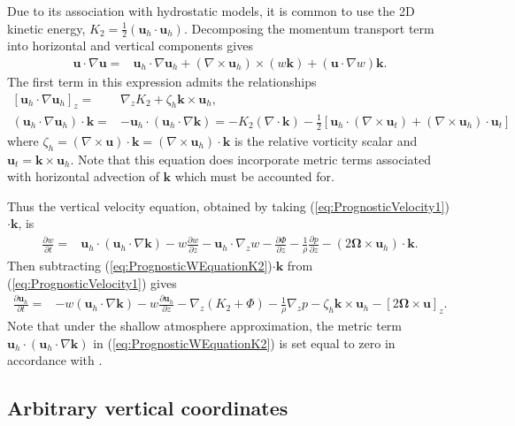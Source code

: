 \documentclass[gmd, manuscript]{copernicus}
\newcommand{\vb}{\mathbf}
\newcommand{\vg}{\boldsymbol}
\newcommand{\pdiff}[2]{\frac{\partial #1}{\partial #2}}
\begin{document}
Due to its association with hydrostatic models, it is common to use the 2D kinetic energy, $K_2 = \frac{1}{2} (\vb{u}_h \cdot \vb{u}_h)$.  Decomposing the momentum transport term into horizontal and vertical components gives
\begin{align}
\vb{u} \cdot \nabla \vb{u} =& \vb{u}_h \cdot \nabla \vb{u}_h + (\nabla \times \vb{u}_h) \times (w \vb{k}) + (\vb{u} \cdot \nabla w) \vb{k}.
\end{align}  The first term in this expression admits the relationships
\begin{align}
\left[ \vb{u}_h \cdot \nabla \vb{u}_h \right]_z =& \nabla_z K_2 + \zeta_h \vb{k} \times \vb{u}_h, \label{eq:UhDotNablaUhRelationship1} \\
(\vb{u}_h \cdot \nabla \vb{u}_h) \cdot \vb{k} =& - \vb{u}_h \cdot (\vb{u}_h \cdot \nabla \vb{k}) = - K_2 (\nabla \cdot \vb{k}) - \tfrac{1}{2} \left[ \vb{u}_h \cdot (\nabla \times \vb{u}_t)  + (\nabla \times \vb{u}_h) \cdot \vb{u}_t \right] \label{eq:UhDotNablaUhRelationship2}
\end{align} where $\zeta_h = (\nabla \times \vb{u}) \cdot \vb{k} = (\nabla \times \vb{u}_h) \cdot \vb{k}$ is the relative vorticity scalar and $\vb{u}_t = \vb{k} \times \vb{u}_h$.  Note that this equation does incorporate metric terms associated with horizontal advection of $\vb{k}$ which must be accounted for.

Thus the vertical velocity equation, obtained by taking (\ref{eq:PrognosticVelocity1})$\cdot \vb{k}$, is
\begin{align} \label{eq:PrognosticWEquationK2}
\pdiff{w}{t} =& \vb{u}_h \cdot (\vb{u}_h \cdot \nabla \vb{k}) - w \pdiff{w}{z} - \vb{u}_h \cdot \nabla_z w - \pdiff{\Phi}{z} - \frac{1}{\rho} \pdiff{p}{z} - (2 \vg{\Omega} \times \vb{u}_h) \cdot \vb{k}.
\end{align}  Then subtracting (\ref{eq:PrognosticWEquationK2})$\cdot \vb{k}$ from (\ref{eq:PrognosticVelocity1}) gives
\begin{align} \label{eq:PrognosticUhEquationK2}
\pdiff{\vb{u}_h}{t} =& - w (\vb{u}_h \cdot \nabla \vb{k}) - w \pdiff{\vb{u}_h}{z} - \nabla_z (K_2 + \Phi) - \frac{1}{\rho} \nabla_z p - \zeta_h \vb{k} \times \vb{u}_h - [2 \vg{\Omega} \times \vb{u}]_z.
\end{align}  Note that under the shallow atmosphere approximation, the metric term $\vb{u}_h \cdot (\vb{u}_h \cdot \nabla \vb{k})$ in (\ref{eq:PrognosticWEquationK2}) is set equal to zero in accordance with \cite{phillips1966equations}.

\subsection{Arbitrary vertical coordinates}
\end{document}
